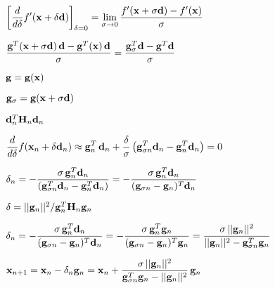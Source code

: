 \documentclass{article}
\def\lthtmlcheckvsize{\ifdim\ht\sizebox<\vsize 
  \ifdim\wd\sizebox<\hsize\expandafter\hfill\fi \expandafter\vfill
  \else\expandafter\vss\fi}%
\begin{document}
{\newpage\clearpage
{}%
$\displaystyle \left[\frac{d}{d\delta} f'({\bf x}+\delta{\bf d})\right]_{\delta=0}
=\lim_{\sigma\rightarrow 0}
\frac{f'({\bf x}+\sigma{\bf d})-f'({\bf x})}{\sigma}$%
\lthtmlindisplaymathZ
\lthtmlcheckvsize\clearpage}

{\newpage\clearpage
{}%
$\displaystyle \frac{{\bf g}^T({\bf x}+\sigma{\bf d})\,{\bf d}-{\bf g}^T({\bf x})\,{\bf d}}
{\sigma}
=\frac{{\bf g}^T_\sigma{\bf d}-{\bf g}^T{\bf d}}{\sigma}$%
\lthtmlindisplaymathZ
\lthtmlcheckvsize\clearpage}

{\newpage\clearpage
{}%
$ {\bf g}={\bf g}({\bf x})$%
\lthtmlindisplaymathZ
\lthtmlcheckvsize\clearpage}

{\newpage\clearpage
{}%
$ {\bf g}_\sigma={\bf g}({\bf x}+\sigma{\bf d})$%
\lthtmlindisplaymathZ
\lthtmlcheckvsize\clearpage}

{\newpage\clearpage
{}%
$ {\bf d}_n^T{\bf H}_n{\bf d}_n$%
\lthtmlindisplaymathZ
\lthtmlcheckvsize\clearpage}

{\newpage\clearpage
{}%
$\displaystyle \frac{d}{d\delta}f({\bf x}_n+\delta{\bf d}_n)
\approx {\bf g}_n^T\,{\bf d}_n+\frac{\delta}{\sigma}
\left({\bf g}_{\sigma n}^T{\bf d}_n-{\bf g}_n^T{\bf d}_n\right)=0$%
\lthtmlindisplaymathZ
\lthtmlcheckvsize\clearpage}

{\newpage\clearpage
{}%
$\displaystyle \delta_n=-\frac{\sigma\,{\bf g}_n^T{\bf d}_n}
{({\bf g}_{\sigma n}^T{\bf d}_n-{\bf g}_n^T{\bf d}_n)}
=-\frac{\sigma\,{\bf g}_n^T{\bf d}_n}{({\bf g}_{\sigma n}-{\bf g}_n)^T{\bf d}_n}$%
\lthtmlindisplaymathZ
\lthtmlcheckvsize\clearpage}

{\newpage\clearpage
{}%
$ \delta=||{\bf g}_n||^2/{\bf g}_n^T{\bf H}_n{\bf g}_n$%
\lthtmlindisplaymathZ
\lthtmlcheckvsize\clearpage}

{\newpage\clearpage
{}%
$\displaystyle \delta_n=-\frac{\sigma\,{\bf g}_n^T{\bf d}_n}{({\bf g}_{\sigma n}-{\bf g}_n)^T{\bf d}_n}
=-\frac{\sigma\,{\bf g}_n^T{\bf g}_n}{({\bf g}_{\sigma n}-{\bf g}_n)^T{\bf g}_n}
=\frac{\sigma\,||{\bf g}_n||^2}{||{\bf g}_n||^2-{\bf g}_{\sigma n}^T{\bf g}_n}$%
\lthtmlindisplaymathZ
\lthtmlcheckvsize\clearpage}

{\newpage\clearpage
{}%
$\displaystyle {\bf x}_{n+1}={\bf x}_n-\delta_n{\bf g}_n
={\bf x}_n+\frac{\sigma\,||{\bf g}_n||^2}{{\bf g}_{\sigma n}^T{\bf g}_n-||{\bf g}_n||^2}\,
{\bf g}_n$%
\lthtmlindisplaymathZ
\lthtmlcheckvsize\clearpage}
\end{document}

